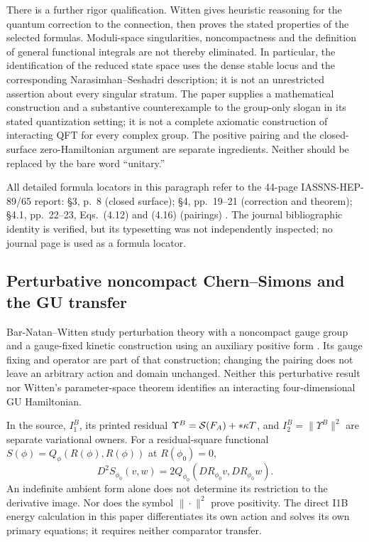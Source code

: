 There is a further rigor qualification. Witten gives heuristic reasoning
for the quantum correction to the connection, then proves the stated
properties of the selected formulas. Moduli-space singularities,
noncompactness and the definition of general functional integrals are
not thereby eliminated. In particular, the identification of the reduced
state space uses the dense stable locus and the corresponding
Narasimhan--Seshadri description; it is not an unrestricted assertion
about every singular stratum. The paper supplies a mathematical construction
and a substantive counterexample to the group-only slogan in its stated
quantization setting; it is not a complete axiomatic construction of
interacting QFT for every complex group. The positive pairing and the
closed-surface zero-Hamiltonian argument are separate ingredients.
Neither should be replaced by the bare word ``unitary.''

All detailed formula locators in this paragraph refer to the
44-page IASSNS-HEP-89/65 report: \S3, p.~8 (closed surface);
\S4, pp.~19--21 (correction and theorem); \S4.1, pp.~22--23,
Eqs.~(4.12) and (4.16) (pairings) \cite{WittenReport}.
The journal bibliographic identity is verified, but its typesetting was
not independently inspected; no journal page is used as a formula locator.


\subsection{Perturbative noncompact Chern--Simons and the GU transfer}
Bar-Natan--Witten study perturbation theory with a noncompact gauge group
and a gauge-fixed kinetic construction using an auxiliary positive form
\cite{BNW}. Its gauge fixing and operator are part of that construction;
changing the pairing does not leave an arbitrary action and domain
unchanged. Neither this perturbative result nor Witten's
parameter-space theorem identifies an interacting four-dimensional GU
Hamiltonian.

In the source, $I_1^B$, its printed residual
$\Upsilon^B=\mathcal S(F_A)+*\kappa T$, and $I_2^B=\|\Upsilon^B\|^2$ are
separate variational owners. For a residual-square functional
$S(\phi)=Q_\phi(R(\phi),R(\phi))$ at $R(\phi_0)=0$,
\[
 D^2S_{\phi_0}(v,w)=2Q_{\phi_0}(DR_{\phi_0}v,DR_{\phi_0}w).
\]
An indefinite ambient form alone does not determine its restriction to
the derivative image. Nor does the symbol $\|\cdot\|^2$ prove positivity.
The direct I1B energy calculation in this paper differentiates its own
action and solves its own primary equations; it requires neither
comparator transfer.

